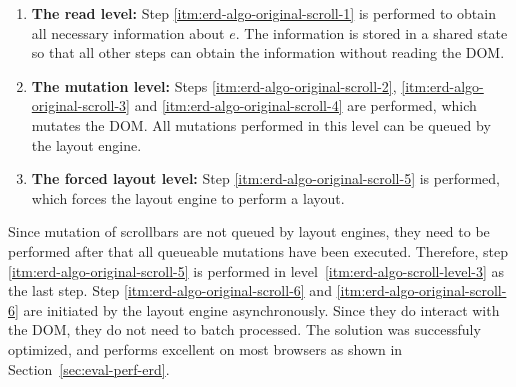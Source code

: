 \documentclass[a4paper,11pt]{kth-mag}
\begin{document}
        \begin{enumerate}
          \item\label{itm:erd-algo-scroll-level-1}
            \textbf{The read level:}
            Step \ref{itm:erd-algo-original-scroll-1} is performed to obtain all necessary information about $e$.
            The information is stored in a shared state so that all other steps can obtain the information without reading the \gls{DOM}.
          \item\label{itm:erd-algo-scroll-level-2}
            \textbf{The mutation level:}
            Steps \ref{itm:erd-algo-original-scroll-2}, \ref{itm:erd-algo-original-scroll-3} and \ref{itm:erd-algo-original-scroll-4} are performed, which mutates the \gls{DOM}.
            All mutations performed in this level can be queued by the layout engine.
          \item\label{itm:erd-algo-scroll-level-3}
            \textbf{The forced layout level:}
            Step \ref{itm:erd-algo-original-scroll-5} is performed, which forces the layout engine to perform a layout.
        \end{enumerate}
        Since mutation of scrollbars are not queued by layout engines, they need to be performed after that all queueable mutations have been executed.
        Therefore, step \ref{itm:erd-algo-original-scroll-5} is performed in level~\ref{itm:erd-algo-scroll-level-3} as the last step.
        Step \ref{itm:erd-algo-original-scroll-6} and \ref{itm:erd-algo-original-scroll-6} are initiated by the layout engine asynchronously.
        Since they do interact with the \gls{DOM}, they do not need to batch processed.
        The solution was successfuly optimized, and performs excellent on most browsers as shown in Section~\ref{sec:eval-perf-erd}.



\end{document}
